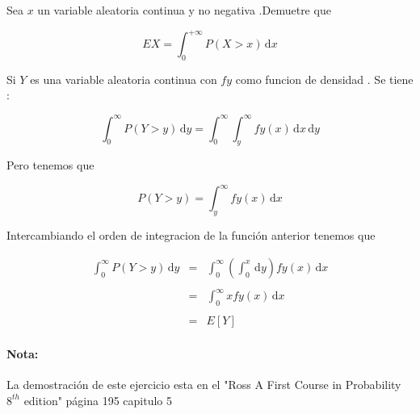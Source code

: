 \documentclass{article}
\begin{document}
    \begin{flushleft}
        
    
        Sea  $x$ un variable aleatoria continua y no negativa .Demuetre que 

        \begin{equation*}
            EX = \int_{0}^{+ \infty} P \left(X > x \right)  \,\mathrm{d}x 
        \end{equation*}

        Si $Y$ es una variable aleatoria continua con $fy$ como funcion de densidad .
        Se tiene : 

        \begin{equation*}
            \int_{0}^{\infty} P \left(Y > y\right)  \,\mathrm{d}y =  
            \int_{0}^{\infty} \int_{y}^{\infty}  fy \left(x\right)\,\mathrm{d}x  \,\mathrm{d}y
        \end{equation*}

        Pero tenemos que  

        \begin{equation*}
            P \left(Y > y \right) = 
            \int_{y}^{\infty} fy \left(x\right) \,\mathrm{d}x 
        \end{equation*}

        Intercambiando el orden de integracion de la funci\'on  anterior tenemos que 

        \begin{equation*}
            \begin{array}{rcl}
                \int_{0}^{\infty} P \left(Y > y \right) \,\mathrm{d}y &  =  &  \int_{0}^{\infty} \left(\int_{0}^{x}  \,\mathrm{d}y \right) fy\left(x\right) \,\mathrm{d}x 
                \\
                \\
                                                                    &  =  &  \int_{0}^{\infty} x fy\left(x\right) \,\mathrm{d}x
                \\
                \\
                                                                    &  =  &  E\left[Y\right]                                           
            \end{array}
        \end{equation*}

        \paragraph{Nota:} La demostraci\'on de este ejercicio esta en el "Ross A First Course in Probability $8^{th}$ edition"  p\'agina 195 capitulo 5

    \end{flushleft}
\end{document}
